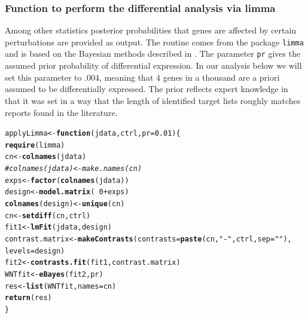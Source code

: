 \documentclass[a4paper]{article}\usepackage[]{graphicx}\usepackage[]{color}
\makeatletter
\newcommand{\hlnum}[1]{\textcolor[rgb]{0.686,0.059,0.569}{#1}}%
\newcommand{\hlstr}[1]{\textcolor[rgb]{0.192,0.494,0.8}{#1}}%
\newcommand{\hlcom}[1]{\textcolor[rgb]{0.678,0.584,0.686}{\textit{#1}}}%
\newcommand{\hlopt}[1]{\textcolor[rgb]{0,0,0}{#1}}%
\newcommand{\hlstd}[1]{\textcolor[rgb]{0.345,0.345,0.345}{#1}}%
\newcommand{\hlkwa}[1]{\textcolor[rgb]{0.161,0.373,0.58}{\textbf{#1}}}%
\newcommand{\hlkwb}[1]{\textcolor[rgb]{0.69,0.353,0.396}{#1}}%
\newcommand{\hlkwc}[1]{\textcolor[rgb]{0.333,0.667,0.333}{#1}}%
\newcommand{\hlkwd}[1]{\textcolor[rgb]{0.737,0.353,0.396}{\textbf{#1}}}%
\newenvironment{kframe}{%
 \def\at@end@of@kframe{}%
 \ifinner\ifhmode%
  \def\at@end@of@kframe{\end{minipage}}%
  \begin{minipage}{\columnwidth}%
 \fi\fi%
 \def\FrameCommand##1{\hskip\@totalleftmargin \hskip-\fboxsep
 \colorbox{shadecolor}{##1}\hskip-\fboxsep
     \hskip-\linewidth \hskip-\@totalleftmargin \hskip\columnwidth}%
 \MakeFramed {\advance\hsize-\width
   \@totalleftmargin\z@ \linewidth\hsize
   \@setminipage}}%
 {\par\unskip\endMakeFramed%
 \at@end@of@kframe}
\newenvironment{knitrout}{}{} %
\makeatother
\begin{document}
\subsubsection*{Function to perform the differential analysis via limma} 
Among other statistics posterior probabilities that genes are affected by certain perturbations are provided as output. The routine comes from the package \verb'limma' and is based on the Bayesian methods described in \cite{art:Smyth2004}. The parameter \verb'pr' gives the assumed prior probability of differential expression. In our analysis below we will set this parameter to .004, meaning that 4 genes in a thousand are a priori assumed to be differentially expressed. The prior reflects expert knowledge in that it was set in a way that the length of identified target lists roughly matches reports found in the literature.
\\
% 
\begin{knitrout}
\color{fgcolor}\begin{kframe}
\begin{alltt}
\hlstd{applyLimma} \hlkwb{<-} \hlkwa{function}\hlstd{(}\hlkwc{jdata}\hlstd{,} \hlkwc{ctrl}\hlstd{,} \hlkwc{pr} \hlstd{=} \hlnum{0.01}\hlstd{) \{}
    \hlkwd{require}\hlstd{(limma)}
    \hlstd{cn} \hlkwb{<-} \hlkwd{colnames}\hlstd{(jdata)}
    \hlcom{# colnames(jdata) <- make.names(cn)}
    \hlstd{exps} \hlkwb{<-} \hlkwd{factor}\hlstd{(}\hlkwd{colnames}\hlstd{(jdata))}
    \hlstd{design} \hlkwb{<-} \hlkwd{model.matrix}\hlstd{(}\hlopt{~}\hlnum{0} \hlopt{+} \hlstd{exps)}
    \hlkwd{colnames}\hlstd{(design)} \hlkwb{<-} \hlkwd{unique}\hlstd{(cn)}
    \hlstd{cn} \hlkwb{<-} \hlkwd{setdiff}\hlstd{(cn, ctrl)}
    \hlstd{fit1} \hlkwb{<-} \hlkwd{lmFit}\hlstd{(jdata, design)}
    \hlstd{contrast.matrix} \hlkwb{<-} \hlkwd{makeContrasts}\hlstd{(}\hlkwc{contrasts} \hlstd{=} \hlkwd{paste}\hlstd{(cn,} \hlstr{"-"}\hlstd{, ctrl,} \hlkwc{sep} \hlstd{=} \hlstr{""}\hlstd{),}
        \hlkwc{levels} \hlstd{= design)}
    \hlstd{fit2} \hlkwb{<-} \hlkwd{contrasts.fit}\hlstd{(fit1, contrast.matrix)}
    \hlstd{WNTfit} \hlkwb{<-} \hlkwd{eBayes}\hlstd{(fit2, pr)}
    \hlstd{res} \hlkwb{<-} \hlkwd{list}\hlstd{(WNTfit,} \hlkwc{names} \hlstd{= cn)}
    \hlkwd{return}\hlstd{(res)}
\hlstd{\}}
\end{alltt}
\end{kframe}
\end{knitrout}
\end{document}
